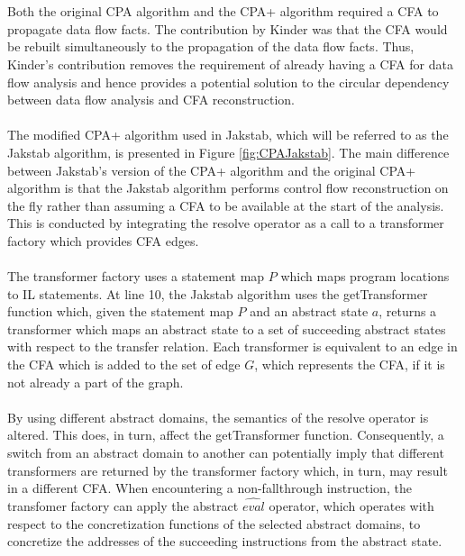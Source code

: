 \documentclass{kththesis}
\begin{document}
\\ \\
Both the original CPA algorithm and the CPA+ algorithm required a CFA to propagate data flow facts. The contribution by Kinder\cite{Jakstab} was that the CFA would be rebuilt simultaneously to the propagation of the data flow facts. Thus, Kinder's contribution removes the requirement of already having a CFA for data flow analysis and hence provides a potential solution to the circular dependency between data flow analysis and CFA reconstruction.
\\ \\ 
The modified CPA+ algorithm used in Jakstab, which will be referred to as the Jakstab algorithm, is presented in Figure \ref{fig:CPAJakstab}. The main difference between Jakstab's version of the CPA+ algorithm and the original CPA+ algorithm is that the Jakstab algorithm performs control flow reconstruction on the fly rather than assuming a CFA to be available at the start of the analysis. This is conducted by integrating the resolve operator as a call to a transformer factory which provides CFA edges. 
\\ \\
The transformer factory uses a statement map $P$ which maps program locations to IL statements. At line 10, the Jakstab algorithm uses the getTransformer function which, given the statement map $P$ and an abstract state $a$, returns a transformer which maps an abstract state to a set of succeeding abstract states with respect to the transfer relation. Each transformer is equivalent to an edge in the CFA which is added to the set of edge $G$, which represents the CFA, if it is not already a part of the graph.
\\ \\
By using different abstract domains, the semantics of the resolve operator is altered. This does, in turn, affect the getTransformer function. Consequently, a switch from an abstract domain to another can potentially imply that different transformers are returned by the transformer factory which, in turn, may result in a different CFA. When encountering a non-fallthrough instruction, the transfomer factory can apply the abstract $\widehat{eval}$ operator, which operates with respect to the concretization functions of the selected abstract domains, to concretize the addresses of the succeeding instructions from the abstract state.
\end{document}

